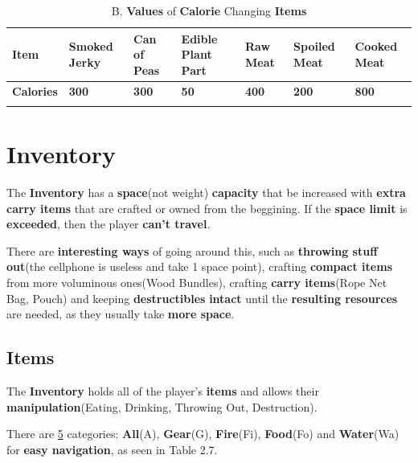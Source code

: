 			\begin{longtable}{|C{4em}|C{4em}|C{4em}|C{4em}|C{4em}|C{4em}|C{4em}|}
			   \toprule
			    \textcolor[rgb]{ 1,  1,  1}{\textbf{Item}} & \textbf{Smoked Jerky} & \textbf{Can of Peas} &\textbf{Edible Plant Part} &\textbf{Raw Meat} & \textbf{Spoiled Meat} & \textbf{Cooked Meat} \\
			    \midrule
			     \textcolor[rgb]{ 1,  1,  1}{\textbf{Calories}}  & \textbf{300} & \textbf{300} & \textbf{50} & \textbf{400} & \textbf{200} & \textbf{800} \\	
			    \bottomrule		
			\caption{B. \textbf{Values} of \textbf{Calorie} Changing \textbf{Items}}
			\end{longtable}


	\section{Inventory}
		\par The \textbf{Inventory} has a \textbf{space}(not weight) \textbf{capacity} that be increased with \textbf{extra carry items} that are crafted or owned from the beggining.  If the \textbf{space limit} is \textbf{exceeded}, then the player \textbf{can't travel}.
		\par There are \textbf{interesting ways} of going around this, such as \textbf{throwing stuff out}(the cellphone is useless and take 1 space point), crafting \textbf{compact items} from more voluminous ones(Wood Bundles), crafting \textbf{carry items}(Rope Net Bag, Pouch) and keeping \textbf{destructibles} \textbf{intact} until the \textbf{resulting resources} are needed, as they usually take \textbf{more space}. 

		\subsection{Items}
			\par The \textbf{Inventory} holds all of the player's \textbf{items} and allows their \textbf{manipulation}(Eating, Drinking, Throwing Out, Destruction). 
			\par There are \underline{5} categories: \textbf{All}(A), \textbf{Gear}(G), \textbf{Fire}(Fi), \textbf{Food}(Fo) and \textbf{Water}(Wa) for \textbf{easy navigation}, as seen in Table 2.7.

